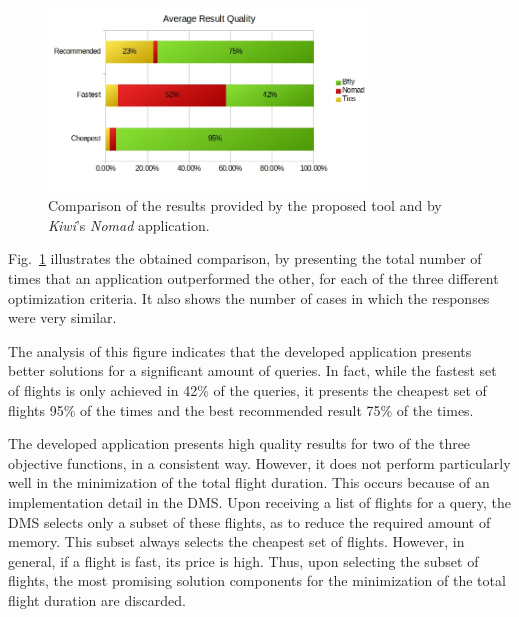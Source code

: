 \begin{figure}[h]
    \centering
    \includegraphics[width=8.5cm]{./imgs/average_result_quality.jpg}
    \caption{Comparison of the results provided by the proposed tool and by \textit{Kiwi}'s \textit{Nomad} application.}
    \label{fig:quality_apis}
\end{figure}

Fig.~\ref{fig:quality_apis} illustrates the obtained comparison, by presenting the total number of times that an application outperformed the other, for each of the three different optimization criteria. It also shows the number of cases in which the responses were very similar.

The analysis of this figure indicates that the developed application presents better solutions for a significant amount of queries. In fact, while the fastest set of flights is only achieved in 42\% of the queries, it presents the cheapest set of flights 95\% of the times and the best recommended result 75\% of the times. 

The developed application presents high quality results for two of the three objective functions, in a consistent way. However, it does not perform particularly well in the minimization of the total flight duration. This occurs because of an implementation detail in the DMS. Upon receiving a list of flights for a query, the DMS selects only a subset of these flights, as to reduce the required amount of memory. This subset always selects the cheapest set of flights. However, in general, if a flight is fast, its price is high. Thus, upon selecting the subset of flights, the most promising solution components for the minimization of the total flight duration are discarded.







